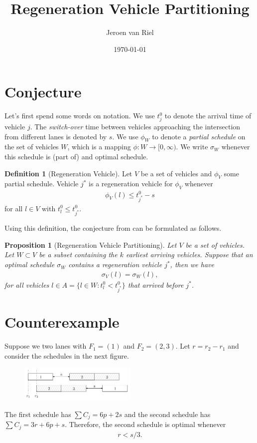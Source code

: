 \documentclass{article}
\title{Regeneration Vehicle Partitioning}
\author{Jeroen van Riel}
\date{\monthyeardate\today}
\theoremstyle{definition}
\newtheorem{define}{Definition}[section]
\theoremstyle{plain}
\newtheorem{proposition}{Proposition}[section]
\begin{document}
\maketitle

\section{Conjecture}

Let's first spend some words on notation. We use $t_{j}^{0}$ to denote the
arrival time of vehicle $j$. The \textit{switch-over} time between vehicles
approaching the intersection from different lanes is denoted by $s$. We use
$\phi_{W}$ to denote a \textit{partial schedule} on the set of vehicles $W$,
which is a mapping $\phi: W \rightarrow [0, \infty)$. We write $\sigma_{W}$
whenever this schedule is (part of) and optimal schedule.

\begin{define}[Regeneration Vehicle]
  Let $V$ be a set of vehicles and $\phi_{V}$ some partial schedule. Vehicle $j^{*}$
  is a regeneration vehicle for $\phi_{V}$ whenever
  \begin{align}
    \phi_{V}(l) \leq t_{j^{*}}^{0} - s
  \end{align}
  for all $l \in V$ with $t_{l}^{0} \leq t_{j^{*}}^{0}$.
\end{define}

Using this definition, the conjecture from
\cite{limpensOnlinePlatoonForming2023} can be formulated as follows.

\begin{proposition}[Regeneration Vehicle Partitioning]
  Let $V$ be a set of vehicles. Let $W \subset V$ be a subset containing the $k$ earliest arriving vehicles. Suppose that an optimal schedule $\sigma_{W}$ contains a regeneration vehicle $j^{*}$, then we have
  \begin{align}
    \sigma_{V}(l) = \sigma_{W}(l) ,
   \end{align}
   for all vehicles $l \in A = \{ l \in W : t_{l}^{0} < t_{j^{*}}^{0} \}$ that
   arrived before $j^{*}$.
\end{proposition}

\section{Counterexample}

Suppose we two lanes with $F_{1} = (1)$ and $F_{2} = (2,3)$.
Let $r = r_{2} - r_{1}$ and consider the schedules in the next figure.
\begin{figure}[h]
  \centering
  \includegraphics[width=0.5\textwidth]{figures/123.pdf}
\end{figure}
The first schedule has $\sum C_{j} = 6p + 2s$ and the second schedule has
$\sum C_{j} = 3r + 6p + s$. Therefore, the second schedule is optimal whenever
\begin{align}
  \label{eq:counter-assump1}
  r < s / 3 .
\end{align}
\end{document}
